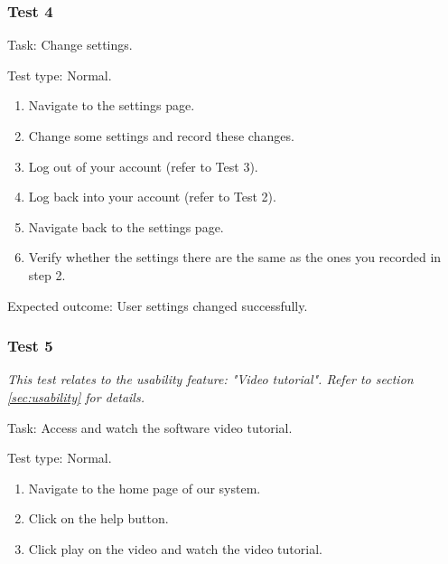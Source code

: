 \subsubsection{Test 4}

{\sffamily Task:} Change settings.\\

{\color{gray} \hrulefill}

{\sffamily Test type: Normal.}\\

\begin{enumerate}
  \item Navigate to the settings page.
  \item Change some settings and record these changes.
  \item Log out of your account (refer to Test 3).
  \item Log back into your account (refer to Test 2).
  \item Navigate back to the settings page.
  \item Verify whether the settings there are the same as the ones you recorded in step 2.
\end{enumerate}

{\sffamily Expected outcome:} User settings changed successfully. \\

{\color{gray} \hrulefill}

\vspace{0.2cm}

\subsubsection{Test 5}

\textit{This test relates to the usability feature:
"Video tutorial". Refer to section
\ref{sec:usability} for details.} \\ \vspace{0.2cm}

{\sffamily Task:} Access and watch the software video tutorial.\\

{\color{gray} \hrulefill}

{\sffamily Test type: Normal.}\\

\begin{enumerate}
  \item Navigate to the home page of our system.
  \item Click on the help button.
  \item Click play on the video and watch the video tutorial.
\end{enumerate}

